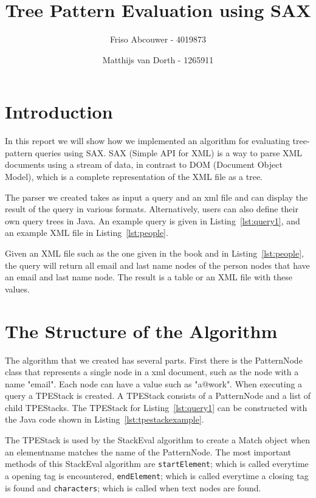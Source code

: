 \documentclass[11pt]{article}
\title{Tree Pattern Evaluation using SAX}
\author{Friso Abcouwer - 4019873 \and Matthijs van Dorth - 1265911}
\begin{document}
\maketitle

\section{Introduction}
In this report we will show how we implemented an algorithm for evaluating tree-pattern queries using SAX. SAX (Simple API for XML) is a way to parse XML documents using a stream of data, in contrast to DOM (Document Object Model), which is a complete representation of the XML file as a tree.

The parser we created takes as input a query and an xml file and can display the result of the query in various formats. Alternatively, users can also define their own query trees in Java.  An example query is given in Listing~\ref{lst:query1}, and an example XML file in Listing~\ref{lst:people}.



Given an XML file such as the one given in the book and in Listing~\ref{lst:people}, the query will return all email and last name nodes of the person nodes that have an email and last name node.
The result is a table or an XML file with these values.



\newpage
\section{The Structure of the Algorithm}
The algorithm that we created has several parts. First there is the PatternNode class that represents a single node in a xml document, such as the node with a name "email". Each node can have a value such as "a@work".
When executing a query a TPEStack is created. A TPEStack consists of a PatternNode and a list of child TPEStacks. The TPEStack for Listing~\ref{lst:query1} can be constructed with the Java code shown in Listing~\ref{lst:tpestackexample}. 



The TPEStack is used by the StackEval algorithm to create a Match object when an elementname matches the
name of the PatternNode. The most important methods of this StackEval algorithm are \lstinline{startElement}; which is called everytime a opening tag is encountered, \lstinline{endElement}; which is called everytime a closing tag is found and \lstinline{characters}; which is called when text nodes are found. 
\end{document}

